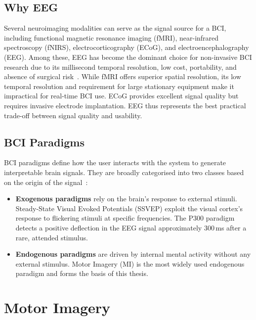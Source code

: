 \documentclass[english, bc, kiv, he, iso690alph, pdf]{fasthesis}
\begin{document}
\subsection{Why EEG}

Several neuroimaging modalities can serve as the signal source for a BCI, including functional magnetic resonance imaging (fMRI), near-infrared spectroscopy (fNIRS), electrocorticography (ECoG), and electroencephalography (EEG). Among these, EEG has become the dominant choice for non-invasive BCI research due to its millisecond temporal resolution, low cost, portability, and absence of surgical risk~\cite{yadav2025decoding}. While fMRI offers superior spatial resolution, its low temporal resolution and requirement for large stationary equipment make it impractical for real-time BCI use. ECoG provides excellent signal quality but requires invasive electrode implantation. EEG thus represents the best practical trade-off between signal quality and usability.

\subsection{BCI Paradigms}

BCI paradigms define how the user interacts with the system to generate interpretable brain signals. They are broadly categorised into two classes based on the origin of the signal~\cite{yadav2025decoding}:

\begin{itemize}
    \item \textbf{Exogenous paradigms} rely on the brain's response to external stimuli. Steady-State Visual Evoked Potentials (SSVEP) exploit the visual cortex's response to flickering stimuli at specific frequencies. The P300 paradigm detects a positive deflection in the EEG signal approximately 300\,ms after a rare, attended stimulus.
    \item \textbf{Endogenous paradigms} are driven by internal mental activity without any external stimulus. Motor Imagery (MI) is the most widely used endogenous paradigm and forms the basis of this thesis.
\end{itemize}

\section{Motor Imagery}
\end{document}
